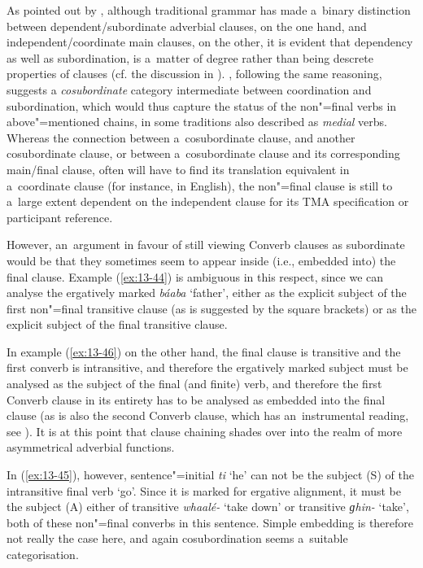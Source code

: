 As pointed out by \citet[327-8]{givon2001b}, although traditional grammar has made a~binary distinction between dependent/subordinate adverbial clauses, on the one hand, and independent/coordinate main clauses, on the other, it is evident that dependency as well as subordination, is a~matter of degree rather than being descrete properties of clauses (cf.  the discussion in \citet[]{cristofaro2005}). \citet[20--27]{haspelmath1995}, following the same reasoning, suggests a \textit{cosubordinate} category intermediate between coordination and subordination, which would thus capture the status of the non"=final verbs in above"=mentioned chains, in some traditions also described as \textit{medial} verbs. Whereas the connection between a~cosubordinate clause, and another cosubordinate clause, or between a~cosubordinate clause and its corresponding main/final clause, often will have to find its translation equivalent in a~coordinate clause (for instance, in English), the non"=final clause is still to a~large extent dependent on the independent clause for its TMA specification or participant reference.



However, an~argument in favour of still viewing Converb clauses as subordinate would be that they sometimes seem to appear inside (i.e., embedded into) the final clause. Example (\ref{ex:13-44}) is ambiguous in this respect, since we can analyse the ergatively marked \textit{báaba} `father', either as the explicit subject of the first non"=final transitive clause (as is suggested by the square brackets) or as the explicit subject of the final transitive clause. 



In example (\ref{ex:13-46}) on the other hand, the final clause is transitive and the first converb is intransitive, and therefore the ergatively marked subject must be analysed as the subject of the final (and finite) verb, and therefore the first Converb clause in its entirety has to be analysed as embedded into the final clause (as is also the second Converb clause, which has an~instrumental reading, see ). It is at this point that clause chaining shades over into the realm of more asymmetrical adverbial functions. 



In (\ref{ex:13-45}), however, sentence"=initial \textit{ti} `he' can not be the subject (S) of the intransitive final verb `go'. Since it is marked for ergative alignment, it must be the subject (A) either of transitive \textit{whaalé-} `take down' or transitive \textit{ɡhin-} `take', both of these non"=final converbs in this sentence. Simple embedding is therefore not really the case here, and again cosubordination seems a~suitable categorisation. 



